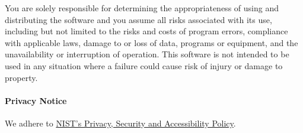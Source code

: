 \documentclass{article}
\begin{document}
You are solely responsible for determining the appropriateness of
using and distributing the software and you assume all risks
associated with its use, including but not limited to the risks and
costs of program errors, compliance with applicable laws, damage to or
loss of data, programs or equipment, and the unavailability or
interruption of operation. This software is not intended to be used in
any situation where a failure could cause risk of injury or damage to
property.

\paragraph{Privacy Notice}
We adhere to \href{http://www.nist.gov/public_affairs/privacy.cfm}{NIST's Privacy, Security and Accessibility Policy}.
\end{document}
